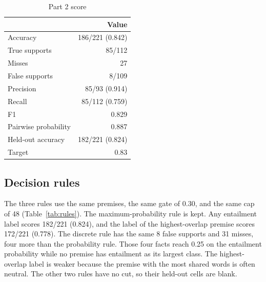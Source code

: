 \begin{table}[H]
\centering
\caption{Part 2 score}
\label{tab:p2score}
\small
\begin{tabular}{@{}lr@{}}
\toprule
 & Value \\
\midrule
Accuracy & 186/221 (0.842) \\
True supports & 85/112 \\
Misses & 27 \\
False supports & 8/109 \\
Precision & 85/93 (0.914) \\
Recall & 85/112 (0.759) \\
F1 & 0.829 \\
Pairwise probability & 0.887 \\
Held-out accuracy & 182/221 (0.824) \\
Target & 0.83 \\
\bottomrule
\end{tabular}
\end{table}

\subsection{Decision rules}

The three rules use the same premises, the same gate of 0.30, and the same cap of 48 (Table~\ref{tab:rules}). The maximum-probability rule is kept. Any entailment label scores 182/221 (0.824), and the label of the highest-overlap premise scores 172/221 (0.778). The discrete rule has the same 8 false supports and 31 misses, four more than the probability rule. Those four facts reach 0.25 on the entailment probability while no premise has entailment as its largest class. The highest-overlap label is weaker because the premise with the most shared words is often neutral. The other two rules have no cut, so their held-out cells are blank.

\begin{table}[H]
\centering
\caption{Decision rules}
\label{tab:rules}
{\footnotesize
{}
}
\end{table}


